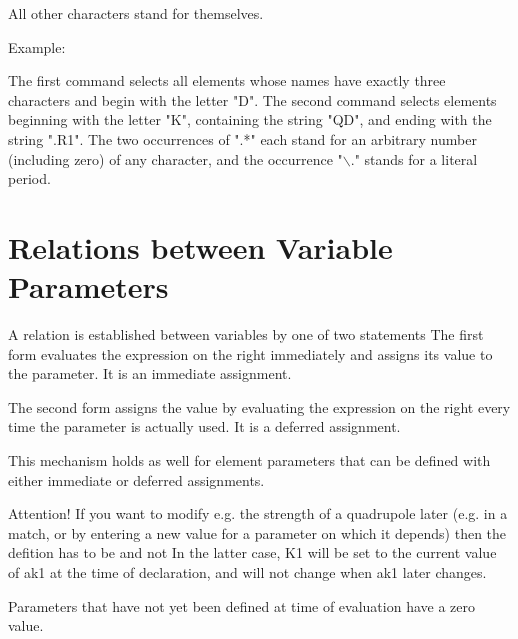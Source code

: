 All other characters stand for themselves. 


Example: 
 
The first command selects all elements whose names have exactly three
characters and begin with the letter "D". The second command selects
elements beginning with the letter "K", containing the string "QD", and
ending with the string ".R1". The two occurrences of ".*" each stand for
an arbitrary number (including zero) of any character, and the
occurrence "$\backslash$." stands for a literal period.  



\section{Relations between Variable Parameters}
\label{sec:relations}\label{sec:defer}
A relation is established between variables by one of two statements 
The first form evaluates the expression on the right immediately and
assigns its value to the parameter. It is an immediate assignment.

The second form assigns the value by evaluating  the expression on the
right every time the parameter is actually used. It is a deferred
assignment.  

This mechanism holds as well for element parameters that can be defined
with either immediate or deferred assignments.

Attention! If you want
to modify e.g. the strength of a quadrupole later (e.g. in a match,  or
by entering a new value for a parameter on which it depends) then the
defition has to be  
and not 
In the latter case, K1 will be set to the current value of ak1 at the
time of declaration, and will not change when ak1 later changes.  

Parameters that have not yet been defined at time of evaluation have a
zero value. 

